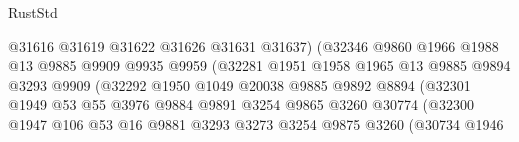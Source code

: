 \begin{lexlean}{RustStd}
\begin{coremodule}
                                      @31616
                                      @31619
                                      @31622
                                      @31626
                                      @31631
                                      @31637)
                                    (@32346
                                      @9860
                                      @1966
                                      @1988
                                      @13
                                      @9885
                                      @9909
                                      @9935
                                      @9959
                                      (@32281
                                        @1951
                                        @1958
                                        @1965
                                        @13
                                        @9885
                                        @9894
                                        @3293
                                        @9909
                                        (@32292
                                          @1950
                                          @1049
                                          @20038
                                          @9885
                                          @9892
                                          @8894
                                          (@32301
                                            @1949
                                            @53
                                            @55
                                            @3976
                                            @9884
                                            @9891
                                            @3254
                                            @9865
                                            @3260
                                            @30774
                                            (@32300
                                              @1947
                                              @106
                                              @53
                                              @16
                                              @9881
                                              @3293
                                              @3273
                                              @3254
                                              @9875
                                              @3260
                                              (@30734
                                                @1946

\end{coremodule}
\end{lexlean}
